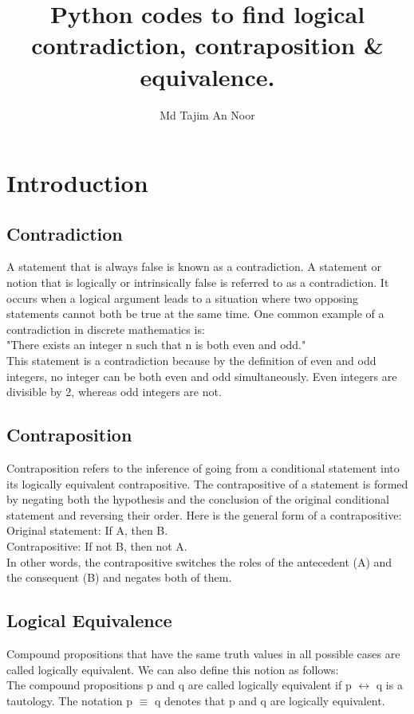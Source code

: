 \documentclass[12pt]{article}
\title{Python codes to find logical contradiction, contraposition \& equivalence.}
\author{Md Tajim An Noor}
\date{}
\begin{document}

\pagebreak

\tableofcontents

\maketitle
\section{Introduction}


\subsection{Contradiction}
A statement that is always false is known as a contradiction. A statement or notion that is logically or intrinsically false is referred to as a contradiction. It occurs when a logical argument leads to a situation where two opposing statements
cannot both be true at the same time. One common example of a
contradiction in discrete mathematics is:\\
\indent"There exists an integer n such that n is both even and odd."\\
This statement is a contradiction because by the definition of even and odd integers, no integer can be both even and odd simultaneously. Even integers are divisible by 2, whereas odd integers are not.

\subsection{Contraposition}
Contraposition refers to the inference of going from a conditional statement into its logically equivalent contrapositive. The contrapositive of a statement is formed by negating both the hypothesis and the conclusion of the original conditional statement and reversing their order. Here is the general form of a contrapositive:\\
\indent Original statement: If A, then B.\\
\indent Contrapositive: If not B, then not A.\\
In other words, the contrapositive switches the roles of the antecedent (A) and the consequent (B) and negates both of them.

\subsection{Logical Equivalence}
Compound propositions that have the same truth values in all possible cases are called logically equivalent. We can also define this notion as follows:\\
The compound propositions p and q are called logically equivalent if p $\leftrightarrow$ q is a tautology. The notation p $\equiv$ q denotes that p and q are logically equivalent.\cite{rosenDiscrete}
\pagebreak
\end{document}
